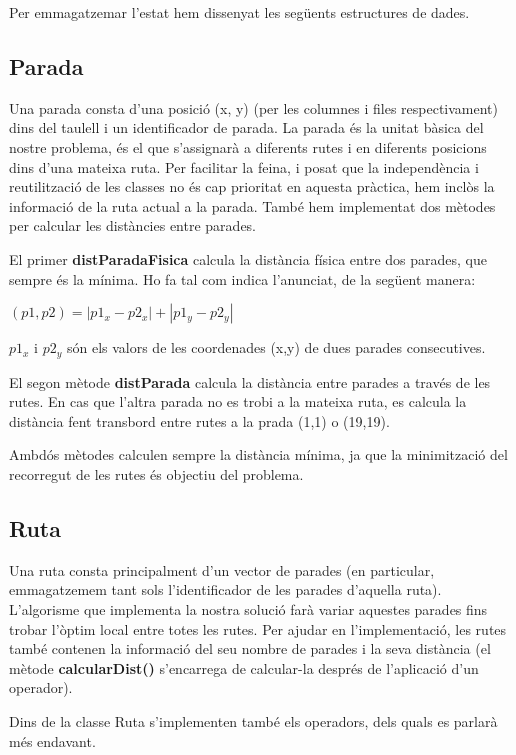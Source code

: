 Per emmagatzemar l'estat hem dissenyat les següents estructures de dades.

\subsection{Parada} %

Una parada consta d'una posició (x, y) (per les columnes i files respectivament) dins del taulell i un identificador de parada. La parada és la unitat bàsica del nostre problema, és el que s'assignarà a diferents rutes i en diferents posicions dins d'una mateixa ruta. Per facilitar la feina, i posat que la independència i reutilització de les classes no és cap prioritat en aquesta pràctica, hem inclòs la informació de la ruta actual a la parada. També hem implementat dos mètodes per calcular les distàncies entre parades. 

El primer \textbf{distParadaFisica} calcula la distància física entre dos parades, que sempre és la mínima. Ho fa tal com indica l'anunciat, de la següent manera:

\begin{center}
$(p1,p2)=|p1_{x} - p2_{x}|+|p1_{y} - p2_{y}|$ 
\end{center}
$p1_{x}$ i $p2_{y}$ són els valors de les coordenades (x,y) de dues parades consecutives.

El segon mètode \textbf{distParada} calcula la distància entre parades a través de les rutes. En cas que l'altra parada no es trobi a la mateixa ruta, es calcula la distància fent transbord entre rutes a la prada (1,1) o (19,19).

Ambdós mètodes calculen sempre la distància mínima, ja que la minimització del recorregut de les rutes és objectiu del problema.

\subsection{Ruta} %

Una ruta consta principalment d'un vector de parades (en particular, emmagatzemem tant sols l'identificador de les parades d'aquella ruta). L'algorisme que implementa la nostra solució farà variar aquestes parades fins trobar l'òptim local entre totes les rutes. Per ajudar en l'implementació, les rutes també contenen la informació del seu nombre de parades i la seva distància (el mètode \textbf{calcularDist()} s'encarrega de calcular-la després de l'aplicació d'un operador).

Dins de la classe Ruta s'implementen també els operadors, dels quals es parlarà més endavant.

